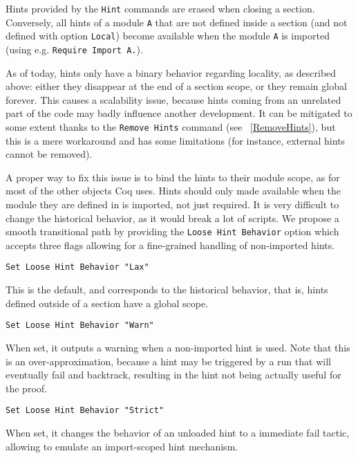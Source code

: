 \begin{coq_example*}
Hints provided by the \texttt{Hint} commands are erased when closing a
section. Conversely, all hints of a module \texttt{A} that are not
defined inside a section (and not defined with option {\tt Local}) become
available when the module {\tt A} is imported (using
e.g. \texttt{Require Import A.}).

As of today, hints only have a binary behavior regarding locality, as described
above: either they disappear at the end of a section scope, or they remain
global forever. This causes a scalability issue, because hints coming from an
unrelated part of the code may badly influence another development. It can be
mitigated to some extent thanks to the {\tt Remove Hints} command
(see ~\ref{RemoveHints}), but this is a mere workaround and has some
limitations (for instance, external hints cannot be removed).

A proper way to fix this issue is to bind the hints to their module scope, as
for most of the other objects Coq uses. Hints should only made available when
the module they are defined in is imported, not just required. It is very
difficult to change the historical behavior, as it would break a lot of scripts.
We propose a smooth transitional path by providing the {\tt Loose Hint Behavior}
option which accepts three flags allowing for a fine-grained handling of
non-imported hints.

\begin{Variants}

\item {\tt Set Loose Hint Behavior "Lax"}

  This is the default, and corresponds to the historical behavior, that is,
  hints defined outside of a section have a global scope.

\item {\tt Set Loose Hint Behavior "Warn"}

  When set, it outputs a warning when a non-imported hint is used. Note that
  this is an over-approximation, because a hint may be triggered by a run that
  will eventually fail and backtrack, resulting in the hint not being actually
  useful for the proof.

\item {\tt Set Loose Hint Behavior "Strict"}

  When set, it changes the behavior of an unloaded hint to a immediate fail
  tactic, allowing to emulate an import-scoped hint mechanism.

\end{Variants}


\end{coq_example*}
